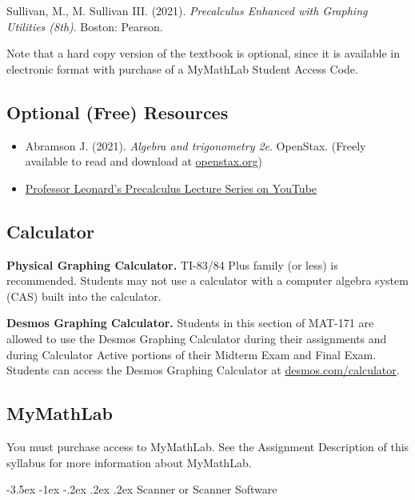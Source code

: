\documentclass{article}
\makeatletter
\renewcommand\section{\@startsection{section}{1}{0pt}%
  {-3.5ex \@plus -1ex \@minus -.2ex}%
  {.2ex \@plus.2ex}%
  {\normalfont\Large\bfseries}} %
\makeatother
\begin{document}
Sullivan, M., M. Sullivan III. (2021). \textit{Precalculus Enhanced with Graphing Utilities (8th)}. Boston: Pearson.

Note that a hard copy version of the textbook is optional, since it is available in electronic format with purchase of a MyMathLab Student Access Code.

\subsection{Optional (Free) Resources}

\begin{itemize}
\item Abramson J. (2021). \textit{Algebra and trigonometry 2e}. OpenStax. (Freely available to read and download at \href{https://openstax.org/details/books/algebra-and-trigonometry-2e.}{openstax.org})


\item \href{https://youtube.com/playlist?list=PLDesaqWTN6ESsmwELdrzhcGiRhk5DjwLP\&si=G7hNZvDueWkJ9Ydf}{Professor Leonard's Precalculus Lecture Series on YouTube}
\end{itemize}

\subsection{Calculator}

\textbf{Physical Graphing Calculator.} TI-83/84 Plus family (or less) is recommended. Students may not use a calculator with a computer algebra system (CAS) built into the calculator.

\textbf{Desmos Graphing Calculator.} Students in this section of MAT-171 are allowed to use the Desmos Graphing Calculator during their assignments and during Calculator Active portions of their Midterm Exam and Final Exam. Students can access the Desmos Graphing Calculator at \href{https://www.desmos.com/calculator}{desmos.com/calculator}.

\subsection{MyMathLab}

You must purchase access to MyMathLab. See the Assignment Description of this syllabus for more information about MyMathLab.

\section{Scanner or Scanner Software}
\end{document}
